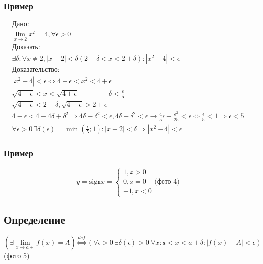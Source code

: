 \documentclass{article}
\begin{document}
\subsubsection{Пример}
\begin{gather*}
    \text{Дано: } \\ 
    \lim_{x \to 2} x^2 = 4, \forall \epsilon > 0 \\
    \text{Доказать: } \\ 
    \exists \delta: \forall x \neq 2, |x - 2| < \delta (2 - \delta < x < 2 + \delta): |x^2 - 4| < \epsilon \\
    \text{Доказательство:} \\
    |x^2 - 4| < \epsilon \Leftrightarrow 4 - \epsilon < x^2 < 4 + \epsilon \\
    \sqrt{4 - \epsilon} < x < \sqrt{4 + \epsilon} ~~~~~~~~~~~~~~~~~~~~ \delta < \frac{\epsilon}{5}\\ 
    \sqrt{4 - \epsilon} < 2 - \delta, \sqrt{4 - \epsilon} > 2 + \epsilon \\
    4 - \epsilon < 4 - 4 \delta + \delta^2 \Rightarrow 4\delta - \delta^2 < \epsilon, 4 \delta + \delta^2 < \epsilon \rightarrow \frac{4}{5} \epsilon + \frac{\epsilon^2}{25} < \epsilon \Leftrightarrow \frac{\epsilon}{5} < 1 \Rightarrow \epsilon < 5 \\
    \forall \epsilon > 0~\exists \delta(\epsilon) = \min \left( \frac{\epsilon}{5} ; 1 \right): |x - 2| < \delta \Rightarrow |x^2 - 4| < \epsilon
\end{gather*}

\subsubsection{Пример}
\begin{gather*}
    y = \text{sign} x = 
    \begin{cases}
        1, x > 0 \\
        0, x = 0 \\
        -1, x < 0
    \end{cases}
    \text{(фото 4)}
\end{gather*}


\subsection{Определение}
\[
(\exists \lim_{x \to a+} f(x) = A) \overset{def}{\Leftrightarrow} (\forall \epsilon >0~\exists \delta(\epsilon) > 0~\forall x: a < x < a + \delta: |f(x) - A| < \epsilon)
\]
(фото 5)
\end{document}
